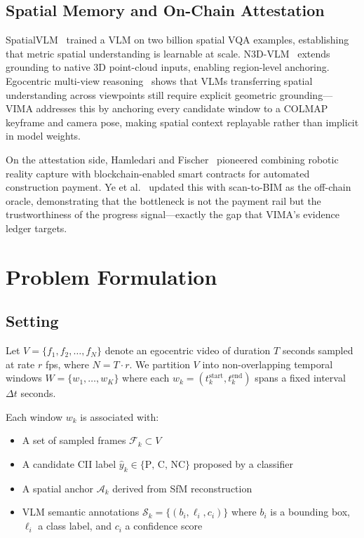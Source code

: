 \documentclass[sigconf,nonacm]{acmart}
\begin{document}
\subsection{Spatial Memory and On-Chain Attestation}

SpatialVLM~\cite{chen2024spatialvlm} trained a VLM on two billion spatial VQA examples, establishing that metric spatial understanding is learnable at scale.
N3D-VLM~\cite{n3dvlm2024} extends grounding to native 3D point-cloud inputs, enabling region-level anchoring.
Egocentric multi-view reasoning~\cite{egocentricmultiview2025} shows that VLMs transferring spatial understanding across viewpoints still require explicit geometric grounding---VIMA addresses this by anchoring every candidate window to a COLMAP keyframe and camera pose, making spatial context replayable rather than implicit in model weights.

On the attestation side, Hamledari and Fischer~\cite{hamledari2021scan} pioneered combining robotic reality capture with blockchain-enabled smart contracts for automated construction payment.
Ye et al.~\cite{ye2025scantobim} updated this with scan-to-BIM as the off-chain oracle, demonstrating that the bottleneck is not the payment rail but the trustworthiness of the progress signal---exactly the gap that VIMA's evidence ledger targets.

\section{Problem Formulation}
\label{sec:problem}

\subsection{Setting}

Let $V = \{f_1, f_2, \ldots, f_N\}$ denote an egocentric video of duration $T$ seconds sampled at rate $r$ fps, where $N = T \cdot r$.
We partition $V$ into non-overlapping temporal windows $W = \{w_1, \ldots, w_K\}$ where each $w_k = (t_k^{\text{start}}, t_k^{\text{end}})$ spans a fixed interval $\Delta t$ seconds.

Each window $w_k$ is associated with:
\begin{itemize}[leftmargin=1.4em,itemsep=0.1em]
\item A set of sampled frames $\mathcal{F}_k \subset V$
\item A candidate CII label $\hat{y}_k \in \{\text{P, C, NC}\}$ proposed by a classifier
\item A spatial anchor $\mathcal{A}_k$ derived from SfM reconstruction
\item VLM semantic annotations $\mathcal{S}_k = \{(b_i, \ell_i, c_i)\}$ where $b_i$ is a bounding box, $\ell_i$ a class label, and $c_i$ a confidence score
\end{itemize}
\end{document}
